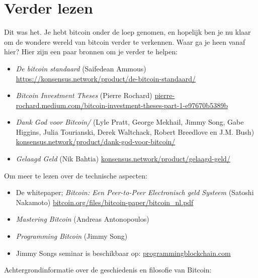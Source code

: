 
\chapter*{Verder lezen}

Dit was het. Je hebt bitcoin onder de loep genomen, en hopelijk ben je nu klaar om de wondere wereld van bitcoin verder te verkennen. Waar ga je heen vanaf hier? Hier zijn een paar bronnen om je verder te helpen:

\begin{itemize}
    \item \textit{De bitcoin standaard} (Saifedean Ammous) \href{https://konsensus.network/product/de-bitcoin-standaard/}{https://konsensus.network/product/de-bitcoin-standaard/}
    \item \textit{Bitcoin Investment Theses} (Pierre Rochard)
    \href{https://pierre-rochard.medium.com/bitcoin-investment-theses-part-1-e97670b5389b}{pierre-rochard.medium.com/bitcoin-investment-theses-part-1-e97670b5389b}
    \item \textit{Dank God voor Bitcoin/} (Lyle Pratt, George Mekhail, Jimmy Song, Gabe Higgins, Julia Tourianski, Derek Waltchack, Robert Breedlove en J.M. Bush) 
    \href{https://konsensus.network/product/dank-god-voor-bitcoin/}{konsensus.network/product/dank-god-voor-bitcoin/}
    \item \textit{Gelaagd Geld} (Nik Bahtia)
    \href{https://konsensus.network/product/gelaagd-geld/}{konsensus.network/product/gelaagd-geld/}
\end{itemize}

Om meer te lezen over de technische aspecten:

\begin{itemize}
    \item De whitepaper; \textit{Bitcoin: Een Peer-to-Peer Electronisch geld Systeem} (Satoshi Nakamoto) \href{https://bitcoin.org/files/bitcoin-paper/bitcoin\_nl.pdf}{bitcoin.org/files/bitcoin-paper/bitcoin\_nl.pdf}
    \item \textit{Mastering Bitcoin} (Andreas Antonopoulos)
    \item \textit{Programming Bitcoin} (Jimmy Song)
    \item Jimmy Songs seminar is beschikbaar op: \href{https://programmingblockchain.com}{programmingblockchain.com}
\end{itemize}

Achtergrondinformatie over de geschiedenis en filosofie van Bitcoin: 

